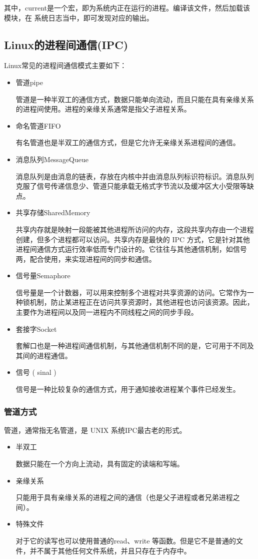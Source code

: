 其中，current是一个宏，即为系统内正在运行的进程。编译该文件，然后加载该模块，在
系统日志当中，即可发现对应的输出。

\subsection{Linux的进程间通信(IPC)}
Linux常见的进程间通信模式主要如下：
\begin{itemize}
    \item 管道pipe

            管道是一种半双工的通信方式，数据只能单向流动，而且只能在具有亲缘关系的进程间使用。进程的亲缘关系通常是指父子进程关系。
    \item 命名管道FIFO

            有名管道也是半双工的通信方式，但是它允许无亲缘关系进程间的通信。
    \item 消息队列MessageQueue

            消息队列是由消息的链表，存放在内核中并由消息队列标识符标识。消息队列克服了信号传递信息少、管道只能承载无格式字节流以及缓冲区大小受限等缺点。
    \item 共享存储SharedMemory

            共享内存就是映射一段能被其他进程所访问的内存，这段共享内存由一个进程创建，但多个进程都可以访问。共享内存是最快的 IPC 方式，它是针对其他进程间通信方式运行效率低而专门设计的。它往往与其他通信机制，如信号两，配合使用，来实现进程间的同步和通信。
    \item 信号量Semaphore

            信号量是一个计数器，可以用来控制多个进程对共享资源的访问。它常作为一种锁机制，防止某进程正在访问共享资源时，其他进程也访问该资源。因此，主要作为进程间以及同一进程内不同线程之间的同步手段。
    \item 套接字Socket

            套解口也是一种进程间通信机制，与其他通信机制不同的是，它可用于不同及其间的进程通信。
    \item 信号 ( sinal )

            信号是一种比较复杂的通信方式，用于通知接收进程某个事件已经发生。
\end{itemize}

\subsubsection{管道方式}
管道，通常指无名管道，是 UNIX 系统IPC最古老的形式。
\begin{itemize}
    \item 半双工

            数据只能在一个方向上流动，具有固定的读端和写端。
    \item 亲缘关系

            只能用于具有亲缘关系的进程之间的通信（也是父子进程或者兄弟进程之间）。
    \item 特殊文件

            对于它的读写也可以使用普通的read、write 等函数。但是它不是普通的文件，并不属于其他任何文件系统，并且只存在于内存中。
\end{itemize}

